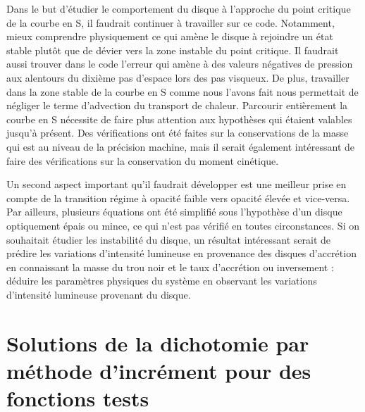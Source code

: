 \documentclass[a4paper,12pt]{article}
\begin{document}
Dans le but d'étudier le comportement du disque à l'approche du point critique de la courbe en S, il faudrait continuer à travailler sur ce code. Notamment, mieux comprendre physiquement ce qui amène le disque à rejoindre un état stable plutôt que de dévier vers la zone instable du point critique. Il faudrait aussi trouver dans le code l'erreur qui amène à des valeurs négatives de pression aux alentours du dixième pas d'espace lors des pas visqueux. De plus, travailler dans la zone stable de la courbe en S comme nous l'avons fait nous permettait de négliger le terme d'advection du transport de chaleur. Parcourir entièrement la courbe en S nécessite de faire plus attention aux hypothèses qui étaient valables jusqu'à présent. Des vérifications ont été faites sur la conservations de la masse qui est au niveau de la précision machine, mais il serait également intéressant de faire des vérifications sur la conservation du moment cinétique.

Un second aspect important qu'il faudrait développer est une meilleur prise en compte de la transition régime à opacité faible vers opacité élevée et vice-versa. Par ailleurs, plusieurs équations ont été simplifié sous l'hypothèse d'un disque optiquement épais ou mince, ce qui n'est pas vérifié en toutes circonstances. 
Si on souhaitait étudier les instabilité du disque, un résultat intéressant serait de prédire les variations d'intensité lumineuse en provenance des disques d'accrétion en connaissant la masse du trou noir et le taux d'accrétion ou inversement : déduire les paramètres physiques du système en observant les variations d'intensité lumineuse provenant du disque.  



\newpage




\newpage
\appendix

\section{Solutions de la dichotomie par méthode d'incrément pour des fonctions tests}
\label{Annexe:dicho}
\end{document}
